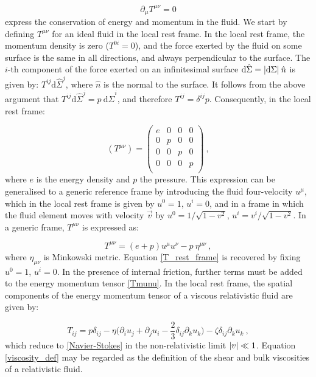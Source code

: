 \begin{equation}
\partial_{\mu} T^{\mu\nu} = 0
\end{equation}
%
express the conservation of energy and momentum in the fluid.
We start by defining $T^{\mu\nu}$ for an ideal fluid in the local rest frame. In the local rest frame, the momentum density is zero ($T^{0i} = 0$), and the force exerted by the fluid on some surface is the same in all directions, and always perpendicular to the surface. The $i$-th component of the force exerted on an infinitesimal surface $\mathrm{d} \hat \Sigma = \abs{\mathrm{d}\Sigma} \: \hat n$ is given by:  $T^{ij} \mathrm{d} \hat \Sigma^j $, where $\hat n$ is the normal to the surface. It follows from the above argument that $T^{ij} \mathrm{d} \hat \Sigma^j = p \: \mathrm{d} \hat \Sigma^i $, and therefore $T^{ij} = \delta^{ij} p$. Consequently, in the local rest frame:
 
 
 \begin{equation}
 (T^{\mu\nu}) =
 \begin{pmatrix}
 e & 0 & 0 & 0 \\
 0 & p & 0 & 0 \\
 0 & 0 & p & 0 \\
 0 & 0 & 0 & p \\
 \end{pmatrix} \: ,
 \label{T_rest_frame}
 \end{equation}
 where $e$ is the energy density and $p$ the pressure.
 This expression can be generalised to a generic reference frame by introducing the fluid four-velocity $u^{\mu}$, which in the local rest frame is given by $u^0 =1$, $u^i =0$, and in a frame in which the fluid element moves with velocity $\vec v$ by $u^0 = 1/\sqrt{1-v^2}$, $u^i = v^i/\sqrt{1-v^2}$. In a generic frame, $T^{\mu\nu}$ is expressed as:
 
 \begin{equation}
 T^{\mu\nu} = (e+p) u^{\mu} u^{\nu} - p \: \eta^{\mu\nu} \: ,
 \label{Tmunu}
 \end{equation}
 where $\eta_{\mu\nu}$ is Minkowski metric. Equation \ref{T_rest_frame} is recovered by fixing $u^0 =1$, $u^i =0$.
In the presence of internal friction, further terms must be added to the energy momentum tensor \ref{Tmunu}. In the local rest frame, the spatial components of the energy momentum tensor of a viscous relativistic fluid are given by:

\begin{equation}
T_{ij} = p \delta_{ij} - \eta \biggl( \partial_i u_j +\partial_j u_i - \frac{2}{3} \delta_{ij} \partial_k u_k \biggr) - \zeta \delta_{ij} \partial_k u_k \: ,
\label{viscosity_def}
\end{equation}
%
which reduce to \ref{Navier-Stokes} in the non-relativistic limit $\abs{v} \ll 1$. Equation \ref{viscosity_def} may be regarded as the definition of the shear and bulk viscosities of a relativistic fluid.
 
